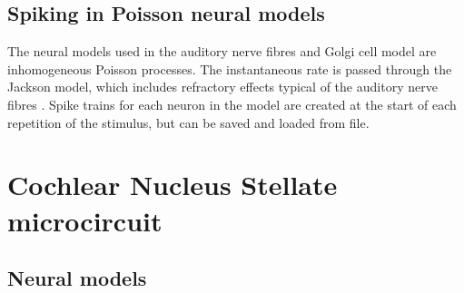 \subsection{Spiking in Poisson neural models}

The neural models used in the auditory nerve fibres and Golgi cell model are
inhomogeneous Poisson processes. The instantaneous rate is passed through the
Jackson model, which includes refractory effects typical of the auditory nerve
fibres \citep{Jackson:2003,JacksonCarney:2005}.  Spike trains for each neuron in
the model are created at the start of each repetition of the stimulus, but can
be saved and loaded from file.










\section{Cochlear Nucleus Stellate microcircuit}

\subsection{Neural models}



